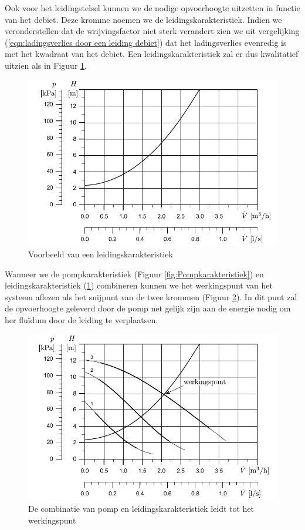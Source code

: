Ook voor het leidingstelsel kunnen we de nodige opvoerhoogte uitzetten in functie van het debiet. Deze kromme noemen we de leidingskarakteristiek. Indien we veronderstellen dat de wrijvingsfactor niet sterk verandert zien we uit vergelijking (\ref{eqn:ladingsverlies door een leiding debiet}) dat het ladingsverlies evenredig is met het kwadraat van het debiet. Een leidingskarakteristiek zal er dus kwalitatief uitzien als in Figuur \ref{fig:Leidingskarakteristiek}.
\begin{figure}
	\centering
	\includegraphics{fig/leidingstelsels/Leidingskarakteristiek}
	\caption{Voorbeeld van een leidingskarakteristiek}
	\label{fig:Leidingskarakteristiek}
\end{figure}
Wanneer we de pompkarakteristiek (Figuur \ref{fig:Pompkarakteristiek}) en leidingskarakteristiek (\ref{fig:Leidingskarakteristiek}) combineren kunnen we het werkingspunt van het systeem aflezen als het snijpunt van de twee krommen (Figuur \ref{fig:Pompleidingkarakteristiek}). In dit punt zal de opvoerhoogte geleverd door de pomp net gelijk zijn aan de energie nodig om her fluïdum door de leiding te verplaatsen.
\begin{figure}
	\centering
	\includegraphics{fig/leidingstelsels/Pompleidingkarakteristiek}
	\caption{De combinatie van pomp en leidingskarakteristiek leidt tot het werkingspunt}
	\label{fig:Pompleidingkarakteristiek}
\end{figure}
